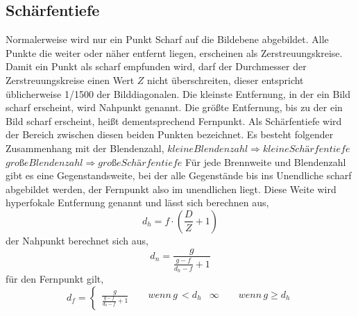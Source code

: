 \subsection{Schärfentiefe}
Normalerweise wird nur ein Punkt Scharf auf die Bildebene abgebildet. Alle Punkte die weiter oder näher entfernt liegen, erscheinen als Zerstreuungskreise. Damit ein Punkt als scharf empfunden wird, darf der Durchmesser der Zerstreuungskreise einen Wert $ \textit{Z} $ nicht überschreiten, dieser entspricht üblicherweise 1/1500 der Bilddiagonalen.
Die kleinste Entfernung, in der ein Bild scharf erscheint, wird Nahpunkt genannt. Die größte Entfernung, bis zu der ein Bild scharf erscheint, heißt dementsprechend Fernpunkt.
Als Schärfentiefe wird der Bereich zwischen diesen beiden Punkten bezeichnet. Es besteht folgender Zusammenhang mit der Blendenzahl,
$kleine Blendenzahl \Rightarrow kleine Schärfentiefe$
$große Blendenzahl \Rightarrow große Schärfentiefe $
Für jede Brennweite und Blendenzahl gibt es eine Gegenstandsweite, bei der alle Gegenstände bis ins Unendliche scharf abgebildet werden, der Fernpunkt also im unendlichen liegt. 
Diese Weite wird hyperfokale Entfernung genannt und lässt sich berechnen aus,
\begin{equation}
d_{h}=f\cdot(\frac{D}{Z}+1)
\end{equation}
der Nahpunkt berechnet sich aus,
\begin{equation}
d_{n}=\frac{g}{\frac{g-f}{d_{h}-f}+1}
\end{equation}
für den Fernpunkt gilt,
\begin{equation}
d_{f}=\begin{cases}
\frac{g}{\frac{g-f}{d_{h}-f}+1}\qquad wenn\, g\,<d_{h} & \infty\qquad wenn\, g\geq d_{h}\end{cases}
\end{equation}
